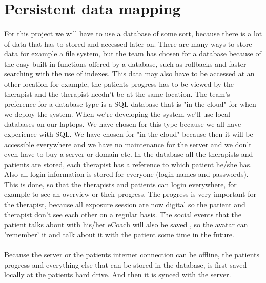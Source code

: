 \section{Persistent data mapping}
\label{sec:datamap}
\paragraph{}
For this project we will have to use a database of some sort, because there is a lot of data that has to stored and accessed later on. There are many ways to store data for example a file system, but the team has chosen for a database because of the easy built-in functions offered by a database, such as rollbacks and faster searching with the use of indexes.
This data may also have to be accessed at an other location for example, the patients progress has to be viewed by the therapist and the therapist needn't be at the same location. The team's preference for a database type is a SQL database that is "in the cloud" for when we deploy the system. When we're developing the system we'll use local databases on our laptops. 
We have chosen for this type because we all have experience with SQL. We have chosen for "in the cloud" because then it will be accessible everywhere and we have no maintenance for the server and we don't even have to buy a server or domain etc. 
In the database all the therapists and patients are stored, each therapist has a reference to which patient he/she has. Also all login information is stored for everyone (login names and passwords). This is done, so that the therapists and patients can login everywhere, for example to see an overview or their progress. The progress is very important for the therapist, because all exposure session are now digital so the patient and therapist don't see each other on a regular basis.
The social events that the patient talks about with his/her eCoach will also be saved , so the avatar can 'remember' it and talk about it with the patient some time in the future.
\paragraph{}
Because the server or the patients internet connection can be offline, the patients progress and everything else that can be stored in the database, is first saved locally at the patients hard drive. And then it is synced with the server.